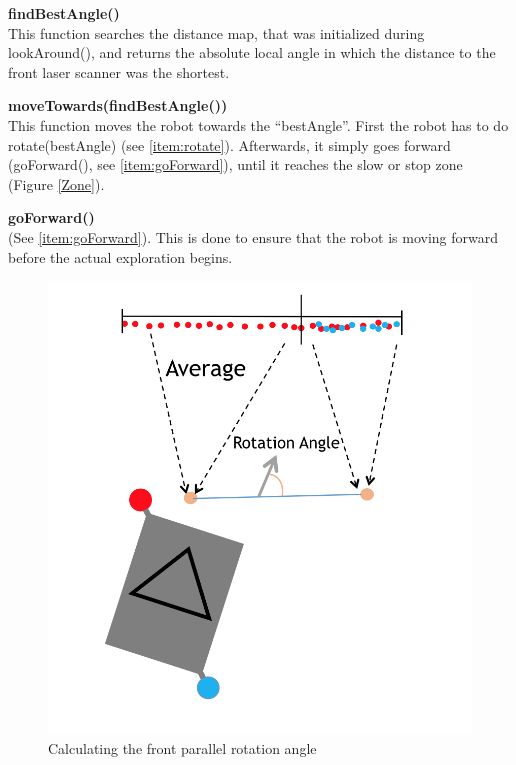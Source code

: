 \begin{description}
\item \textbf{findBestAngle()} \hfill \\
This function searches the distance map, that was initialized during lookAround(), and returns the absolute local angle in which the distance to the front laser scanner was the shortest. 

\item \textbf{moveTowards(findBestAngle())} \hfill \\
This function moves the robot towards the ``bestAngle''. First the robot has to do rotate(bestAngle) (see \ref{item:rotate}). Afterwards, it simply goes forward (goForward(), see \ref{item:goForward}), until it reaches the slow or stop zone (Figure \ref{Zone}).

\item \textbf{goForward()} \hfill \\
(See \ref{item:goForward}). This is done to ensure that the robot is moving forward before the actual exploration begins.
 
\begin{figure}[ht]
\centering
\includegraphics[scale=0.575]{graphics/front_parallel.png}
\caption{Calculating the front parallel rotation angle}
\label{parallel}
\centering
\end{figure} 
 

\end{description}
